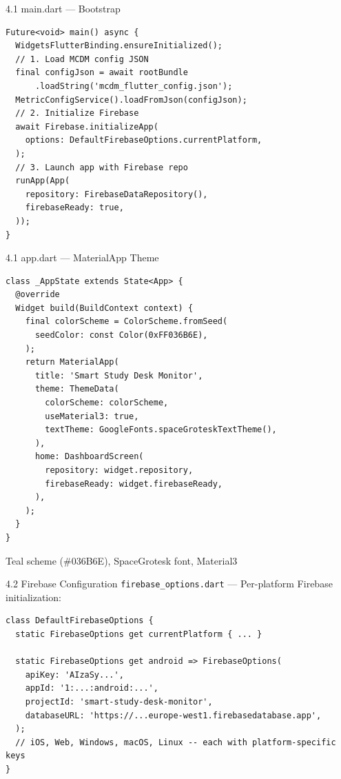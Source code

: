\documentclass[aspectratio=169]{beamer}
\begin{document}
\begin{frame}{4.1 main.dart --- Bootstrap}
  \begin{lstlisting}[style=dartstyle,basicstyle=\ttfamily\footnotesize]
Future<void> main() async {
  WidgetsFlutterBinding.ensureInitialized();
  // 1. Load MCDM config JSON
  final configJson = await rootBundle
      .loadString('mcdm_flutter_config.json');
  MetricConfigService().loadFromJson(configJson);
  // 2. Initialize Firebase
  await Firebase.initializeApp(
    options: DefaultFirebaseOptions.currentPlatform,
  );
  // 3. Launch app with Firebase repo
  runApp(App(
    repository: FirebaseDataRepository(),
    firebaseReady: true,
  ));
}
  \end{lstlisting}
\end{frame}

\begin{frame}{4.1 app.dart --- MaterialApp Theme}
  \begin{lstlisting}[style=dartstyle,basicstyle=\ttfamily\footnotesize]
class _AppState extends State<App> {
  @override
  Widget build(BuildContext context) {
    final colorScheme = ColorScheme.fromSeed(
      seedColor: const Color(0xFF036B6E),
    );
    return MaterialApp(
      title: 'Smart Study Desk Monitor',
      theme: ThemeData(
        colorScheme: colorScheme,
        useMaterial3: true,
        textTheme: GoogleFonts.spaceGroteskTextTheme(),
      ),
      home: DashboardScreen(
        repository: widget.repository,
        firebaseReady: widget.firebaseReady,
      ),
    );
  }
}
  \end{lstlisting}
  \vspace{0.1cm}
  \small Teal scheme (\#036B6E), SpaceGrotesk font, Material3
\end{frame}

\begin{frame}{4.2 Firebase Configuration}
  \texttt{firebase\_options.dart} --- Per-platform Firebase initialization:

  \vspace{0.1cm}
  \begin{lstlisting}[style=dartstyle,basicstyle=\ttfamily\footnotesize]
class DefaultFirebaseOptions {
  static FirebaseOptions get currentPlatform { ... }

  static FirebaseOptions get android => FirebaseOptions(
    apiKey: 'AIzaSy...',
    appId: '1:...:android:...',
    projectId: 'smart-study-desk-monitor',
    databaseURL: 'https://...europe-west1.firebasedatabase.app',
  );
  // iOS, Web, Windows, macOS, Linux -- each with platform-specific keys
}
  \end{lstlisting}
\end{frame}
\end{document}
